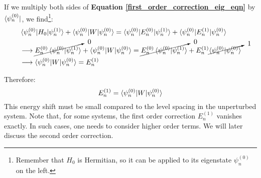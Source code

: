 If we multiply both sides of \textbf{Equation \ref{first_order_correction_eig_eqn}} by $\bra{\psi_n^{(0)}}$, we find\footnote{Remember that $H_0$ is Hermitian, so it can be applied to its eigenstate $\psi_n^{(0)}$ on the left.}:
\begin{equation}
    \begin{split}
        &\braket{\psi_n^{(0)}|H_0|\psi_n^{(1)}} + \braket{\psi_n^{(0)}|W|\psi_n^{(0)}} = \braket{\psi_n^{(0)}|E_n^{(0)}|\psi_n^{(1)}} + \braket{\psi_n^{(0)}|E_n^{(1)}|\psi_n^{(0)}}\\
        &\longrightarrow \cancelto{\ 0}{E_n^{(0)}\braket{\psi_n^{(0)}|\psi_n^{(1)}}} + \braket{\psi_n^{(0)}|W|\psi_n^{(0)}} = \cancelto{\ 0}{E_n^{(0)}\braket{\psi_n^{(0)}|\psi_n^{(1)}}} + E_n^{(1)}\cancelto{\ 1}{\braket{\psi_n^{(0)}|\psi_n^{(0)}}} \\
        &\longrightarrow \braket{\psi_n^{(0)}|W|\psi_n^{(0)}} = E_n^{(1)}
    \end{split}
\end{equation}

Therefore:
\begin{equation}
    E_n^{(1)} = \braket{\psi_n^{(0)}|W|\psi_n^{(0)}}
\end{equation}
This energy shift must be small compared to the level spacing in the unperturbed system. Note that, for some systems, the first order correction $E_n^{(1)}$ vanishes exactly. In such cases, one needs to consider higher order terms. We will later discuss the second order correction.

